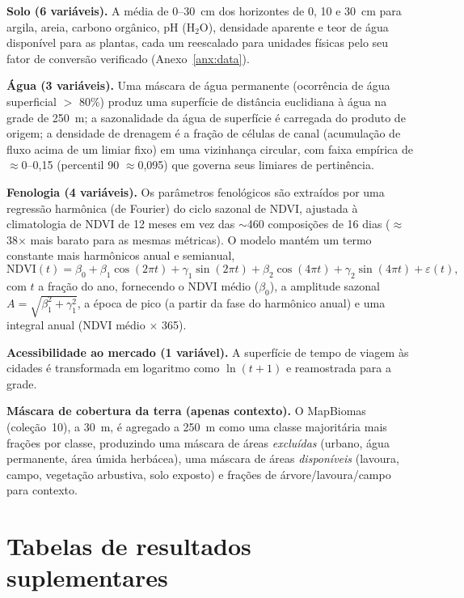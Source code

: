 \textbf{Solo (6 variáveis).} A média de 0--30~cm dos horizontes de 0, 10 e 30~cm para argila,
areia, carbono orgânico, pH (H$_2$O), densidade aparente e teor de água disponível para as
plantas, cada um reescalado para unidades físicas pelo seu fator de conversão verificado
(Anexo~\ref{anx:data}).

\textbf{Água (3 variáveis).} Uma máscara de água permanente (ocorrência de água superficial
$>$ 80\%) produz uma superfície de distância euclidiana à água na grade de 250~m; a
sazonalidade da água de superfície é carregada do produto de origem; a densidade de drenagem
é a fração de células de canal (acumulação de fluxo acima de um limiar fixo) em uma
vizinhança circular, com faixa empírica de $\approx$0--0,15 (percentil 90 $\approx$0,095) que
governa seus limiares de pertinência.

\textbf{Fenologia (4 variáveis).} Os parâmetros fenológicos são extraídos por uma regressão
harmônica (de Fourier) do ciclo sazonal de NDVI, ajustada à climatologia de NDVI de 12 meses
em vez das $\sim$460 composições de 16 dias ($\approx$38$\times$ mais barato para as mesmas
métricas). O modelo mantém um termo constante mais harmônicos anual e semianual,
\begin{equation*}
  \mathrm{NDVI}(t) = \beta_0 + \beta_1 \cos(2\pi t) + \gamma_1 \sin(2\pi t)
   + \beta_2 \cos(4\pi t) + \gamma_2 \sin(4\pi t) + \varepsilon(t),
\end{equation*}
com $t$ a fração do ano, fornecendo o NDVI médio ($\beta_0$), a amplitude sazonal
$A = \sqrt{\beta_1^2 + \gamma_1^2}$, a época de pico (a partir da fase do harmônico anual) e
uma integral anual (NDVI médio $\times$ 365).

\textbf{Acessibilidade ao mercado (1 variável).} A superfície de tempo de viagem às cidades é
transformada em logaritmo como $\ln(t+1)$ e reamostrada para a grade.

\textbf{Máscara de cobertura da terra (apenas contexto).} O MapBiomas (coleção~10), a 30~m, é
agregado a 250~m como uma classe majoritária mais frações por classe, produzindo uma máscara de
áreas \emph{excluídas} (urbano, água permanente, área úmida herbácea), uma máscara de áreas
\emph{disponíveis} (lavoura, campo, vegetação arbustiva, solo exposto) e frações de
árvore/lavoura/campo para contexto.

\chapter{Tabelas de resultados suplementares}\label{anx:tables}

